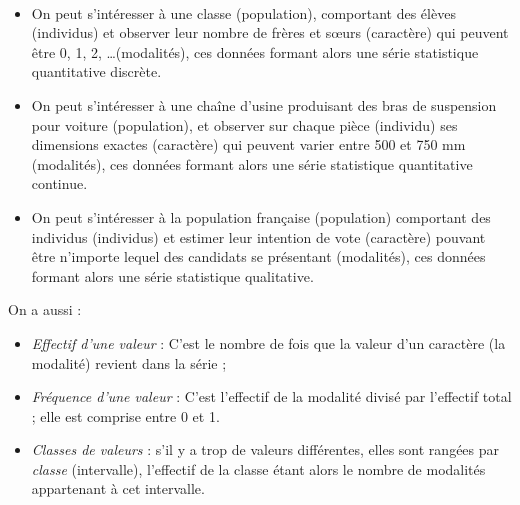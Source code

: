 \begin{exemples*}~
\begin{itemize}
 \item On peut s'int\'eresser \`a une classe (population),
comportant des \'el\`eves (individus) et observer leur nombre de fr\`eres et s\oe{}urs (caract\`ere)
qui peuvent \^etre 0, 1, 2, \ldots (modalit\'es),
ces donn\'ees formant alors une s\'erie statistique quantitative discr\`ete.
 \item On peut s'int\'eresser \`a une cha\^ine d'usine produisant des bras de suspension pour voiture (population),
et observer sur chaque pi\`ece (individu) ses dimensions exactes (caract\`ere)
qui peuvent varier entre 500 et 750 mm (modalit\'es),
ces donn\'ees formant alors une s\'erie statistique quantitative continue.
 \item On peut s'int\'eresser \`a la population fran\c{c}aise (population)
comportant des individus (individus) et estimer leur intention de vote (caract\`ere) pouvant \^etre n'importe
lequel des candidats se pr\'esentant (modalit\'es),
ces donn\'ees formant alors une s\'erie statistique qualitative.
\end{itemize}
\end{exemples*}

\begin{definition}
On a aussi :
\begin{itemize}
	\item \emph{Effectif d'une valeur} : C'est le nombre de fois que la valeur d'un caract\`ere (la modalit\'e) revient dans la s\'erie ;
	\item \emph{Fr\'equence d'une valeur} : C'est l'effectif de la modalit\'e divis\'e par l'effectif total ; elle est comprise entre 0 et 1.
	\item \emph{Classes de valeurs} : s'il y a trop de valeurs diff\'erentes, elles sont rang\'ees par \emph{classe} (intervalle), l'effectif de la classe \'etant alors le nombre de modalit\'es appartenant \`a cet intervalle.
\end{itemize}
\end{definition}



